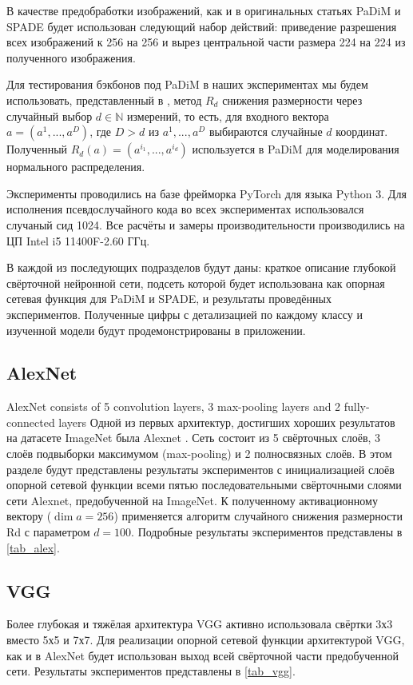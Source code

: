 \documentclass{article}
\begin{document}
\begin{large}
В качестве предобработки изображений, как и в оригинальных статьях PaDiM \cite{padim} и SPADE \cite{spade} будет использован следующий набор действий: приведение разрешения всех изображений к 256 на 256 и вырез центральной части размера 224 на 224 из полученного изображения.

Для тестирования бэкбонов под PaDiM в наших экспериментах мы будем использовать, представленный в \cite{padim}, метод $R_d$ снижения размерности через случайный выбор $d \in \mathbb{N}$ измерений, то есть, для входного вектора $a = (a^1, ..., a^D)$, где $D > d$ из $a^1, ..., a^D$ выбираются случайные $d$ координат. Полученный $R_d(a) = (a^{i_1}, ..., a^{i_d})$ используется в PaDiM для моделирования нормального распределения.

Эксперименты проводились на базе фрейморка PyTorch для языка Python 3. Для исполнения псевдослучайного кода во всех экспериментах использовался случаный сид 1024. Все расчёты и замеры производительности производились на ЦП Intel i5 11400F-2.60 ГГц.

В каждой из последующих подразделов будут даны: краткое описание глубокой свёрточной нейронной сети, подсеть которой будет использована как опорная сетевая функция для PaDiM и SPADE, и результаты проведённых экспериментов. Полученные цифры с детализацией по каждому классу и изученной модели будут продемонстрированы в приложении.


\subsection{AlexNet}

AlexNet consists of 5 convolution layers, 3 max-pooling layers and 2 fully-connected layers
Одной из первых архитектур, достигших хороших результатов на датасете ImageNet была Alexnet \cite{alexnet}. Сеть состоит из 5 свёрточных слоёв, 3 слоёв подвыборки максимумом (max-pooling) и 2 полносвязных слоёв. В этом разделе будут представлены результаты экспериментов с инициализацией слоёв опорной сетевой функции всеми пятью последовательными свёрточными слоями сети Alexnet, предобученной на ImageNet. К полученному активационному вектору ($\dim a = 256$) применяется алгоритм случайного снижения размерности Rd с параметром $d = 100$. Подробные результаты экспериментов представлены в \ref{tab_alex}.

\subsection{VGG}
Более глубокая и тяжёлая архитектура VGG \cite{vgg} активно использовала свёртки 3х3 вместо 5х5 и 7х7. Для реализации опорной сетевой функции архитектурой VGG, как и в AlexNet будет использован выход всей свёрточной части предобученной сети. Результаты экспериментов представлены в \ref{tab_vgg}.


\end{large}
\end{document}

